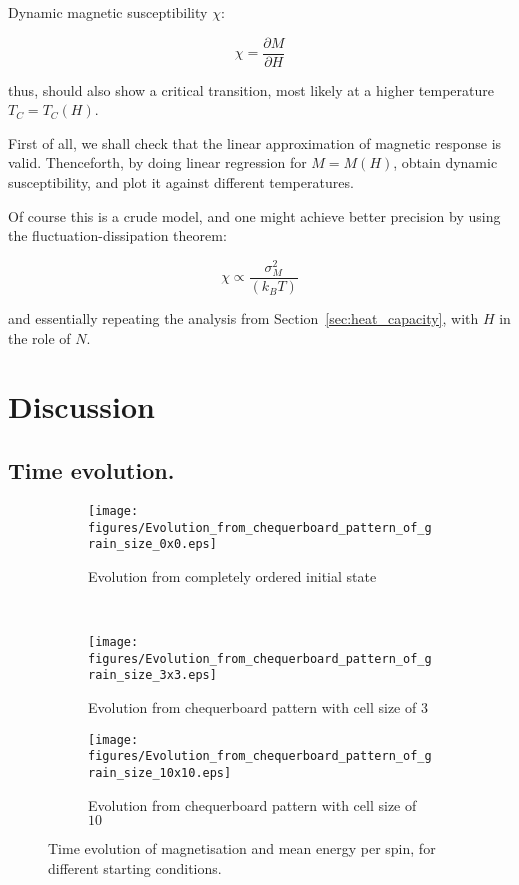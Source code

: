 \documentclass[12pt]{article}
\begin{document}
Dynamic magnetic susceptibility \(\chi \):

\begin{equation}\label{eq:dynamic_chi}
  \chi = \frac{\partial M}{\partial H}
\end{equation}

thus, should also show a critical transition, most likely at a higher temperature \(T_C = T_C (H)\).

First of all, we shall check that the linear approximation of magnetic response is valid. Thenceforth, by doing linear regression for \(M = M (H)\), obtain dynamic susceptibility, and plot it against different temperatures. 

Of course this is a crude model, and one might achieve better precision by using the fluctuation-dissipation theorem\cite{fdt}:

\begin{equation}\label{eq:fluctuation-dissipation-magnetisation}
 \chi \propto \frac{\sigma_M^2}{ {(k_B T)}}
\end{equation}

and essentially repeating the analysis from Section~\ref{sec:heat_capacity}, with \(H \) in the role of \(N\).

\section{Discussion}\label{sec:discussion}

\subsection{Time evolution. }

\begin{figure}[p]
  \begin{subfigure}[b] {0.49\textwidth}
    \texttt{[image: figures/Evolution\_from\_chequerboard\_pattern\_of\_grain\_size\_0x0.eps]}
    \caption{Evolution from completely ordered initial state}
  \end{subfigure}\ 
  \begin{subfigure}[b] {0.49\textwidth}
    \texttt{[image: figures/Evolution\_from\_chequerboard\_pattern\_of\_grain\_size\_3x3.eps]}
    \caption{Evolution from chequerboard pattern with cell size of \(3\)}
  \end{subfigure}\newline
  \begin{subfigure}[b] {0.49\textwidth}
    \texttt{[image: figures/Evolution\_from\_chequerboard\_pattern\_of\_grain\_size\_10x10.eps]}
    \caption{Evolution from chequerboard pattern with cell size of \(10\)}
  \end{subfigure}\newline
  \caption[Time evolution]{Time evolution of magnetisation and mean energy per spin, for different starting conditions. }\label{fig:time_evolution}
\end{figure}
\end{document}
